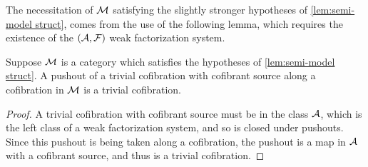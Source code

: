 \documentclass{amsart}
\begin{document}
The necessitation of $\mathcal{M}$ satisfying the slightly stronger hypotheses of \ref{lem:semi-model struct}, comes from the use of the following lemma, which requires the existence of the $(\mathcal{A},\mathcal{F})$ weak factorization system.
\begin{lem}
    Suppose $\mathcal{M}$ is a category which satisfies the hypotheses of \ref{lem:semi-model struct}. A pushout of a trivial cofibration with cofibrant source along a cofibration in $\mathcal{M}$ is a trivial cofibration.
\end{lem}
\begin{proof}
    A trivial cofibration with cofibrant source must be in the class $\mathcal{A}$, which is the left class of a weak factorization system, and so is closed under pushouts. Since this pushout is being taken along a cofibration, the pushout is a map in $\mathcal{A}$ with a cofibrant source, and thus is a trivial cofibration.
\end{proof}
\end{document}
